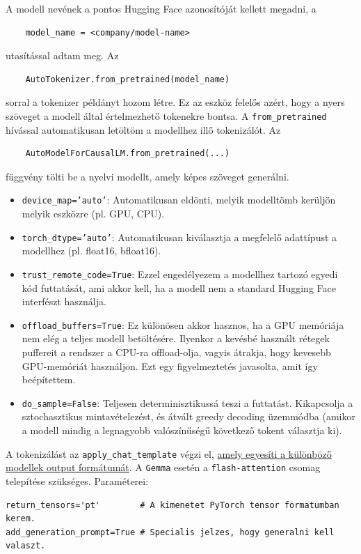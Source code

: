 \documentclass[12pt]{report}
\theoremstyle{definition}
\begin{document}
A modell nevének a pontos Hugging Face azonosítóját kellett megadni, a
\begin{lstlisting}
    model_name = <company/model-name>
\end{lstlisting}
utasítással adtam meg. Az
\begin{lstlisting}
    AutoTokenizer.from_pretrained(model_name)
\end{lstlisting}
sorral a tokenizer példányt hozom létre. Ez az eszköz felelős azért, hogy a nyers szöveget a modell által értelmezhető tokenekre bontsa. A \texttt{from\_pretrained} hívással automatikusan letöltöm a modellhez illő tokenizálót.
Az
\begin{lstlisting}
    AutoModelForCausalLM.from_pretrained(...)
\end{lstlisting}
függvény tölti be a nyelvi modellt, amely képes szöveget generálni. %
\begin{itemize}
	\item \texttt{device\_map='auto'}: Automatikusan eldönti, melyik modelltömb kerüljön melyik eszközre (pl. GPU, CPU).

	    \item  \texttt{torch\_dtype='auto'}: Automatikusan kiválasztja a megfelelő adattípust a modellhez (pl. float16, bfloat16).

	  \item    \texttt{trust\_remote\_code=True}: Ezzel engedélyezem a modellhez tartozó egyedi kód futtatását, ami akkor kell, ha a modell nem a standard Hugging Face interfészt használja.

	      \item \texttt{offload\_buffers=True}: Ez különösen akkor hasznos, ha a GPU memóriája nem elég a teljes modell betöltésére. Ilyenkor a kevésbé használt rétegek puffereit a rendszer a CPU-ra offload-olja, vagyis átrakja, hogy kevesebb GPU-memóriát használjon. Ezt egy figyelmeztetés javasolta, amit így beépítettem.

          \item \texttt{do\_sample=False}: Teljesen determinisztikussá teszi a futtatást. Kikapcsolja a sztochasztikus mintavételezést, és átvált greedy decoding üzemmódba (amikor a modell mindig a legnagyobb valószínűségű következő tokent választja ki).
\end{itemize}

A tokenizálást az \texttt{apply\_chat\_template} végzi el,
\href{https://huggingface.co/docs/transformers/main/en/chat_templating}{amely egyesíti a különböző modellek output formátumát}.
A \texttt{Gemma} esetén a \texttt{flash-attention} csomag telepítése szükséges. Paraméterei:
\begin{lstlisting}
return_tensors='pt'        # A kimenetet PyTorch tensor formatumban kerem.
add_generation_prompt=True # Specialis jelzes, hogy generalni kell valaszt.
\end{lstlisting}
\end{document}
